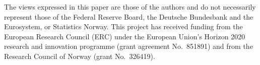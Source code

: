 \documentclass[\latexroot/HAFiscal]{subfiles}
\begin{document}

\newcommand{\thanksInput}[1]{%
  \IfFileExists{\latexroot/Subfiles/#1.tex}%
  {\ignorespaces\unskip}%
  {}%
}%

\whenintegrated{\label{funding-info}} 
\vspace{0.3\baselineskip}
\begin{minipage}{\textwidth}
  \footnotesize The views expressed in this paper are those of the authors and do not necessarily represent those of the Federal Reserve Board, the Deutsche Bundesbank and the Eurosystem, or Statistics Norway. This project has received funding from the European Research Council (ERC) under the European Union's Horizon 2020 research and innovation programme (grant agreement No.\ 851891) and from the Research Council of Norway (grant No.\ 326419).

  
\end{minipage}

%
\end{document}
